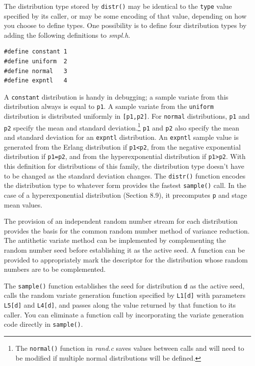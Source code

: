 The distribution type stored by \texttt{distr()} may be identical to the \texttt{type}
value specified by its caller, or may be some encoding of that value, depending
on how you choose to define types. One possibility is to define four
distribution types by adding the following definitions to \emph{smpl.h}.
\begin{verbatim}
#define constant 1
#define uniform  2
#define normal   3
#define expntl   4
\end{verbatim}

A \texttt{constant} distribution is handy in debugging; a sample variate from this
distribution always is equal to \texttt{p1}. A sample variate from the \texttt{uniform}
distribution is distributed uniformly in \texttt{[p1,p2]}. For \texttt{normal} distributions,
\texttt{p1} and \texttt{p2} specify the mean and standard deviation.\footnote{The \texttt{normal()} function in \emph{rand.c} saves values between calls and will need to be modified if multiple normal distributions will be defined.}
\texttt{p1} and \texttt{p2} also specify
the mean and standard deviation for an \texttt{expntl} distribution. An \texttt{expntl}
sample value is generated from the Erlang distribution if \texttt{p1<p2}, from the
negative exponential distribution if \texttt{p1=p2}, and from the hyperexponential
distribution if \texttt{p1>p2}. With this definition for distributions of this family,
the distribution type doesn't have to be changed as the standard deviation
changes. The \texttt{distr()} function encodes the distribution type to whatever
form provides the fastest \texttt{sample()} call. In the case of a hyperexponential
distribution (Section 8.9), it precomputes \texttt{p} and stage mean values.

The provision of an independent random number stream for each distribution
provides the basis for the common random number method of variance
reduction. The antithetic variate method can be implemented by complementing
the random number seed before establishing it as the active seed. A
function can be provided to appropriately mark the descriptor for the distribution
whose random numbers are to be complemented.

The \texttt{sample()} function establishes the seed for distribution \texttt{d} as the
active seed, calls the random variate generation function specified by \texttt{L1[d]}
with parameters \texttt{L5[d]} and \texttt{L4[d]}, and passes along the value returned by
that function to its caller. You can eliminate a function call by incorporating
the variate generation code directly in \texttt{sample()}.

